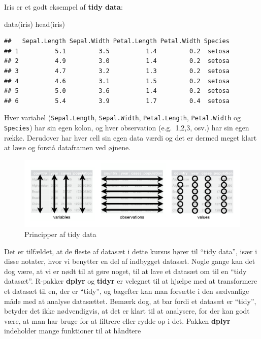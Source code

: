 \documentclass[
]{book}
\newenvironment{Shaded}{\begin{snugshade}}{\end{snugshade}}
\newcommand{\FunctionTok}[1]{\textcolor[rgb]{0.00,0.00,0.00}{#1}}
\newcommand{\NormalTok}[1]{#1}
\begin{document}
Iris er et godt eksempel af \textbf{tidy data}:

\begin{Shaded}
\begin{Highlighting}[]
\FunctionTok{data}\NormalTok{(iris)}
\FunctionTok{head}\NormalTok{(iris)}
\end{Highlighting}
\end{Shaded}

\begin{verbatim}
##   Sepal.Length Sepal.Width Petal.Length Petal.Width Species
## 1          5.1         3.5          1.4         0.2  setosa
## 2          4.9         3.0          1.4         0.2  setosa
## 3          4.7         3.2          1.3         0.2  setosa
## 4          4.6         3.1          1.5         0.2  setosa
## 5          5.0         3.6          1.4         0.2  setosa
## 6          5.4         3.9          1.7         0.4  setosa
\end{verbatim}

Hver variabel (\texttt{Sepal.Length}, \texttt{Sepal.Width}, \texttt{Petal.Length}, \texttt{Petal.Width} og \texttt{Species}) har sin egen kolon, og hver observation (e.g.~1,2,3, osv.) har sin egen række. Derudover har hver cell sin egen data værdi og det er dermed meget klart at læse og forstå dataframen ved øjnene.

\begin{figure}
\centering
\includegraphics[width=1\textwidth,height=\textheight]{plots/tidy-1.png}
\caption{Principper af tidy data}
\end{figure}

Det er tilfældet, at de fleste af datasæt i dette kursus hører til ``tidy data'', især i disse notater, hvor vi benytter en del af indbygget datasæt. Nogle gange kan det dog være, at vi er nødt til at gøre noget, til at lave et datasæt om til en ``tidy datasæt''. R-pakker \textbf{dplyr} og \textbf{tidyr} er velegnet til at hjælpe med at transformere et datasæt til en, der er ``tidy'', og bagefter kan man forsætte i den sædvanlige måde med at analyse datasættet. Bemærk dog, at bar fordi et datasæt er ``tidy'', betyder det ikke nødvendigvis, at det er klart til at analysere, for der kan godt være, at man har bruge for at filtrere eller rydde op i det. Pakken \textbf{dplyr} indeholder mange funktioner til at håndtere
\end{document}
